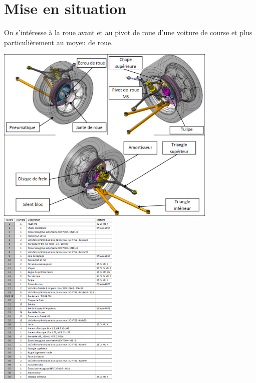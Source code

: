 \documentclass[10pt,fleqn]{article} %
\begin{document}

\vspace{5.5cm}
\pagestyle{fancy}
\thispagestyle{plain}


\def\columnseprulecolor{\color{ocre}}
\setlength{\columnseprule}{0.4pt} 

\section*{Mise en situation}
\ifprof
\else
\fi

On s'intéresse à la roue avant et au pivot de roue d'une voiture de course et plus particulièrement au moyeu de roue.

\begin{center}
\includegraphics[height=8.5cm]{images/fig_02}
\includegraphics[height=8.5cm]{images/fig_03}
\end{center}
\end{document}
